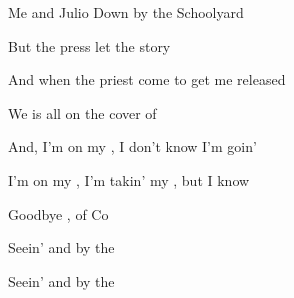\begin{SBSong}{Me and Julio Down by the Schoolyard}
\begin{SBVerse}
    But the press let the story 

    And when the  priest come to get me released

    We is all on the cover of 
  \end{SBVerse}
  \begin{SBChorus}
    And, I'm on my , I don't know  I'm goin'

    I'm on my , I'm takin' my , but I  know 

    Goodbye , of Co

    Seein'  and   by the  

    Seein'  and   by the  
  \end{SBChorus}
\end{SBSong}
